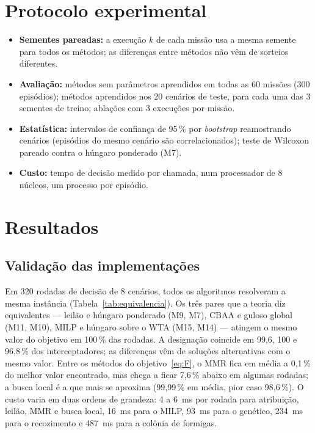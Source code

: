 \documentclass[11pt,a4paper]{article}
\begin{document}
\section{Protocolo experimental}\label{sec:protocolo}
\begin{itemize}
  \item \textbf{Sementes pareadas:} a execução $k$ de cada missão usa a mesma semente para todos os métodos; as
        diferenças entre métodos não vêm de sorteios diferentes.
  \item \textbf{Avaliação:} métodos sem parâmetros aprendidos em todas as 60 missões (300 episódios); métodos aprendidos
        nos 20 cenários de teste, para cada uma das 3 sementes de treino; ablações com 3 execuções por missão.
  \item \textbf{Estatística:} intervalos de confiança de 95\,\% por \emph{bootstrap} reamostrando cenários (episódios do
        mesmo cenário são correlacionados); teste de Wilcoxon pareado contra o húngaro ponderado (M7).
  \item \textbf{Custo:} tempo de decisão medido por chamada, num processador de 8 núcleos, um processo por episódio.
\end{itemize}

\section{Resultados}\label{sec:resultados}

\subsection{Validação das implementações}\label{sec:validacao}
Em 320 rodadas de decisão de 8 cenários, todos os algoritmos resolveram a mesma instância
(Tabela~\ref{tab:equivalencia}). Os três pares que a teoria diz equivalentes --- leilão e húngaro ponderado (M9, M7), CBAA
e guloso global (M11, M10), MILP e húngaro sobre o WTA (M15, M14) --- atingem o mesmo valor do objetivo em 100\,\% das
rodadas. A designação coincide em 99,6, 100 e 96,8\,\% dos interceptadores; as diferenças vêm de soluções alternativas
com o mesmo valor. Entre os métodos do objetivo~\eqref{eq:F}, o MMR fica em média a 0,1\,\% do melhor valor encontrado,
mas chega a ficar 7,6\,\% abaixo em algumas rodadas; a busca local é a que mais se aproxima (99,99\,\% em média, pior caso
98,6\,\%). O custo varia em duas ordens de grandeza: 4 a 6~ms por rodada para atribuição, leilão, MMR e busca local, 16~ms
para o MILP, 93~ms para o genético, 234~ms para o recozimento e 487~ms para a colônia de formigas.
\end{document}
